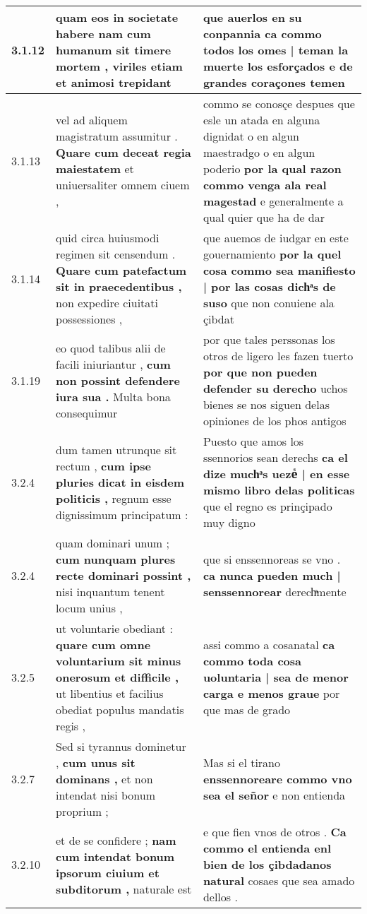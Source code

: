 \begin{tabular}{|p{1cm}|p{6.5cm}|p{6.5cm}|}
3.1.12 & quam eos in societate habere \textbf{ nam cum humanum sit timere mortem , } viriles etiam et animosi trepidant & que auerlos en su conpannia \textbf{ ca commo todos los omes | teman la muerte los esforçados } e de grandes coraçones temen \\\hline
3.1.13 & vel ad aliquem magistratum assumitur . \textbf{ Quare cum deceat regia maiestatem } et uniuersaliter omnem ciuem , & commo se conosçe despues que esle un atada en alguna dignidat o en algun maestradgo o en algun poderio \textbf{ por la qual razon commo venga ala real magestad } e generalmente a qual quier que ha de dar \\\hline
3.1.14 & quid circa huiusmodi regimen sit censendum . \textbf{ Quare cum patefactum sit in praecedentibus , } non expedire ciuitati possessiones , & que auemos de iudgar en este gouernamiento \textbf{ por la quel cosa commo sea manifiesto | por las cosas dichͣs de suso } que non conuiene ala çibdat \\\hline
3.1.19 & eo quod talibus alii de facili iniuriantur , \textbf{ cum non possint defendere iura sua . } Multa bona consequimur & por que tales perssonas los otros de ligero les fazen tuerto \textbf{ por que non pueden defender su derecho } uchos bienes se nos siguen delas opiniones de los phos antigos \\\hline
3.2.4 & dum tamen utrunque sit rectum , \textbf{ cum ipse pluries dicat in eisdem politicis , } regnum esse dignissimum principatum : & Puesto que amos los ssennorios sean derechs \textbf{ ca el dize muchͣs uezeᷤ | en esse mismo libro delas politicas } que el regno es prinçipado muy digno \\\hline
3.2.4 & quam dominari unum ; \textbf{ cum nunquam plures recte dominari possint , } nisi inquantum tenent locum unius , & que si enssennoreas se vno . \textbf{ ca nunca pueden much | senssennorear } derechͣmente \\\hline
3.2.5 & ut voluntarie obediant : \textbf{ quare cum omne voluntarium sit minus onerosum et difficile , } ut libentius et facilius obediat populus mandatis regis , & assi commo a cosanatal \textbf{ ca commo toda cosa uoluntaria | sea de menor carga e menos graue } por que mas de grado \\\hline
3.2.7 & Sed si tyrannus dominetur , \textbf{ cum unus sit dominans , } et non intendat nisi bonum proprium ; & Mas si el tirano \textbf{ enssennoreare commo vno sea el señor } e non entienda \\\hline
3.2.10 & et de se confidere ; \textbf{ nam cum intendat bonum ipsorum ciuium et subditorum , } naturale est & e que fien vnos de otros . \textbf{ Ca commo el entienda enl bien de los çibdadanos natural } cosaes que sea amado dellos . \\\hline

\end{tabular}
